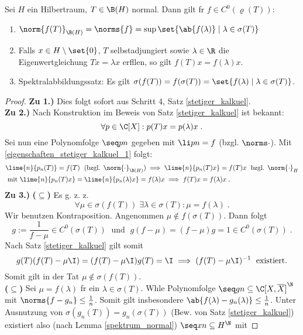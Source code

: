 \begin{rem}
	\begin{theorem}\label{eigenschaften_stetiger_kalkuel}
		Sei $H$ ein Hilbertraum, \(T\in \B(H)\) normal.  Dann gilt f\us r \(f\in C^0(\varrho(T))\):
		\begin{enumerate}
			\item \(\norm{f(T)}_{\B(H)} = \norms{f} = \sup\set{\ab{f(\lambda)}\;\vert\;\lambda \in \sigma(T)}\) \label{eigenschaften_stetiger_kalkuel_1}
			\item Falls \(x\in H\setminus\set{0}\), \(T\) selbstadjungiert sowie \(\lambda \in \R\) die Eigenwertgleichung \(Tx = \lambda x\) erf\us llen, so gilt \(f(T)x = f(\lambda)x\)\;.
			\item Spektralabbildungssatz: Es gilt \(\sigma(f(T)) = f(\sigma(T)) = \set{f(\lambda)\;\vert\;\lambda \in \sigma(T)}\).
		\end{enumerate}
	\end{theorem}
	\begin{proof}
		\textbf{Zu 1.)} Dies folgt sofort aus Schritt 4, Satz \ref{stetiger_kalkuel}.\\
		\textbf{Zu 2.)} Nach Konstruktion im Beweis von Satz \ref{stetiger_kalkuel} ist bekannt:
		\[\forall p \in \C[X]: p(T)x = p(\lambda)x\;.\]
		Sei nun eine Polynomfolge \(\seq pn\) gegeben mit \(\li pn = f\) (bzgl. \(\norms\cdot\)). Mit \ref{eigenschaften_stetiger_kalkuel_1} folgt:
		\begin{align*}
		&\lime{n}{p_n(T)} = f(T)\;\text{ (bzgl. $\norm{\cdot}_{\B(H)}$)} \implies \lime{n}{p_n(T)x} = f(T)x \;\text{ bzgl. $\norm{\cdot}_{H}$} \\
		& \text{ mit }\lime{n}{p_n(T)x} = \lime{n}{p_n(\lambda)x} = f(\lambda)x \implies f(T)x = f(\lambda)x\;.
		\end{align*}
		\textbf{Zu 3.)} \textbf{($\subseteq$)} Es g. z. z. 
		\[\forall \mu \in \sigma(f(T)) \;\exists \lambda \in \sigma(T): \mu = f(\lambda)\;.\]
		Wir benutzen Kontraposition. Angenommen \(\mu \not\in f(\sigma(T))\). Dann folgt
		\[g := \frac{1}{f-\mu} \in C^0(\sigma(T)) \;\text{ und }\; g(f-\mu) = (f-\mu)g = 1 \in C^0(\sigma(T))\;.\]
		Nach Satz \ref{stetiger_kalkuel} gilt somit
		\[g(T)(f(T) -\mu\I) = (f(T) -\mu\I)g(T) = \I \implies (f(T) -\mu\I)^{-1}\;\text{ existiert.}\]
		Somit gilt in der Tat \(\mu\not\in \sigma(f(T))\).\\
		\textbf{($\subseteq$)} Sei \(\mu = f(\lambda)\) f\us r ein \(\lambda \in \sigma(T)\). W\as hle Polynomfolge \(\seq gn \subseteq \C[X,\overline X]^\N\) mit \(\norms{f - g_n} \leq \frac1n\). Somit gilt insbesondere \(\ab{f(\lambda) - g_n(\lambda)} \leq \frac 1n\). Unter Ausnutzung von \(\sigma(g_n(T)) = g_n(\sigma(T))\) (Bew. von Satz \ref{stetiger_kalkuel}) existiert also (nach Lemma \ref{spektrum_normal}) \(\seq xn \subseteq H^\N\) mit 

\end{proof}
\end{rem}
